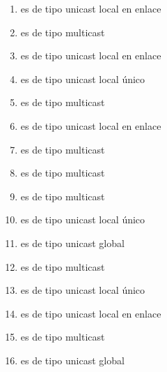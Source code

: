 \documentclass[letterpaper,10pt,spanish]{sphinxmanual}
\begin{document}
\begin{enumerate}
\item {} 
 es de tipo unicast local en enlace

\item {} 
 es de tipo multicast

\item {} 
 es de tipo unicast local en enlace

\item {} 
 es de tipo unicast local único

\item {} 
 es de tipo multicast

\item {} 
 es de tipo unicast local en enlace

\item {} 
 es de tipo multicast

\item {} 
 es de tipo multicast

\item {} 
 es de tipo multicast

\item {} 
 es de tipo unicast local único

\item {} 
 es de tipo unicast global

\item {} 
 es de tipo multicast

\item {} 
 es de tipo unicast local único

\item {} 
 es de tipo unicast local en enlace

\item {} 
 es de tipo multicast

\item {} 
 es de tipo unicast global


\end{enumerate}
\end{document}
